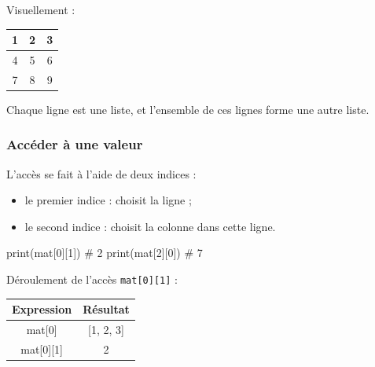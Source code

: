 \documentclass[11pt]{article}
\begin{document}
		Visuellement :
		
		\begin{center}
			\begin{tabular}{|c|c|c|}
				\hline
				1 & 2 & 3 \\
				\hline
				4 & 5 & 6 \\
				\hline
				7 & 8 & 9 \\
				\hline
			\end{tabular}
		\end{center}
		
		Chaque ligne est une liste, et l’ensemble de ces lignes forme une autre liste.
		
		\medskip
		
		\subsubsection*{Accéder à une valeur}
		
		L’accès se fait à l’aide de deux indices :
		
		\begin{itemize}
			\item le premier indice : choisit la ligne ;
			\item le second indice : choisit la colonne dans cette ligne.
		\end{itemize}
		
		\begin{python}
			print(mat[0][1])  # 2
			print(mat[2][0])  # 7\end{python}
			
		\bigskip
		
		Déroulement de l’accès \texttt{mat[0][1]} :
		
		\begin{center}
			\begin{tabular}{|c|c|}
				\hline
				\textbf{Expression} & \textbf{Résultat} \\
				\hline
				mat[0] & [1, 2, 3] \\
				\hline
				mat[0][1] & 2 \\
				\hline
			\end{tabular}
		\end{center}
		
		\medskip
		
		
		\medskip
		
		
\end{document}

